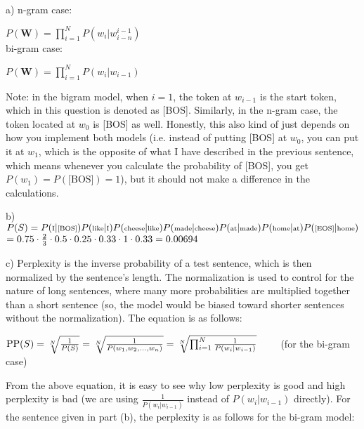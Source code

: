 \begin{solution} \ \\
	a) n-gram case:
	
	$P(\textbf{W}) = \prod_{i=1}^{N} P(w_i | w_{i-n}^{i-1})$\\
	
	bi-gram case:
	
	$P(\textbf{W}) = \prod_{i=1}^{N} P(w_i | w_{i-1})$
	
	Note: in the bigram model, when $i = 1$, the token at $w_{i-1}$ is the start token, which in this question is denoted as [BOS]. Similarly, in the n-gram case, the token located at $w_0$ is [BOS] as well. Honestly, this also kind of just depends on how you implement both models (i.e. instead of putting [BOS] at $w_0$, you can put it at $w_1$, which is the opposite of what I have described in the previous sentence, which means whenever you calculate the probability of [BOS], you get $P(w_1) = P(\text{[BOS]}) = 1$), but it should not make a difference in the calculations.
	
	b) $\scriptsize P(S) = P(\text{I} \vert \text{[BOS]}) P(\text{like} \vert \text{I})P(\text{cheese} \vert \text{like}) P(\text{made} \vert \text{cheese}) P(\text{at} \vert \text{made}) P(\text{home} \vert \text{at}) P(\text{[EOS]} \vert \text{home})$\\
	$= 0.75 \cdot \frac{2}{3} \cdot 0.5 \cdot 0.25 \cdot 0.33 \cdot 1 \cdot 0.33\\
	= 0.00694$
	
	c) Perplexity is the inverse probability of a test sentence, which is then normalized by the sentence's length. The normalization is used to control for the nature of long sentences, where many more probabilities are multiplied together than a short sentence (so, the model would be biased toward shorter sentences without the normalization). The equation is as follows:
	
	$\text{PP}(S) = \sqrt[N]{\frac{1}{P(S)}} = \sqrt[N]{\frac{1}{P(w_1, w_2, \dots, w_n)}}\\
	= \sqrt[N]{\prod_{i=1}^{N}\frac{1}{P(w_i \vert w_{i-1})}} \qquad$ (for the bi-gram case)
	
	From the above equation, it is easy to see why low perplexity is good and high perplexity is bad (we are using $\frac{1}{P(w_i \vert w_{i-1})}$ instead of $P(w_i \vert w_{i-1})$ directly). For the sentence given in part (b), the perplexity is as follows for the bi-gram model:
	

\end{solution}
